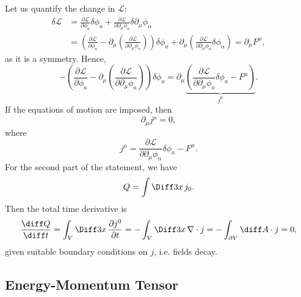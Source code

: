 \documentclass[12pt]{article}
\begin{document}
\begin{proofbox}
	Let us quantify the change in $\mathcal{L}$:
	\begin{align*}
		\delta \mathcal{L} &= \frac{\partial \mathcal{L}}{\partial \phi_a}  \delta \phi_a + \frac{\partial \mathcal{L}}{\partial \partial_\mu \phi_a} \delta \partial_\mu \phi_\alpha \\
				   &= \left( \frac{\partial \mathcal{L}}{\partial \phi_a} - \partial_\mu \left( \frac{\partial \mathcal{L}}{\partial \partial_\mu \phi_a} \right) \right) \delta \phi_a + \partial_\mu \left( \frac{\partial \mathcal{L}}{\partial \partial_\mu \phi_a} \delta \phi_\alpha \right) = \partial_\mu F^\mu,
	\end{align*}
	as it is a symmetry. Hence,
	\[
		- \left( \frac{\partial \mathcal{L}}{\partial \phi_a} - \partial_\mu \left( \frac{\partial \mathcal{L}}{\partial \partial_\mu \phi_a} \right) \right) \delta \phi_a = \partial_\mu \underbrace{\left( \frac{\partial \mathcal{L}}{\partial \partial_\mu \phi_a} \delta \phi_a - F^\mu \right)}_{j^\mu}.
	\]
	If the equations of motion are imposed, then
	\[
	\partial_\mu j^\mu = 0,
	\]
	where
	\[
	j^\mu = \frac{\partial \mathcal{L}}{\partial \partial_\mu \phi_\alpha} \delta \phi_a - F^\mu.
	\]
	For the second part of the statement, we have
	\[
	Q = \int \Diff 3 x \, j_0.
	\]
	Then the total time derivative is
	\[
	\frac{\diff Q}{\diff t} = \int_V \Diff3 x\, \frac{\partial j^0}{\partial t} = - \int_V \Diff3 x \, \nabla \cdot j = - \int_{\partial V} \diff A \cdot j = 0,
	\]
	given suitable boundary conditions on $j$, i.e. fields decay.
\end{proofbox}

\subsection{Energy-Momentum Tensor}%
\label{sub:em_t}
\end{document}
